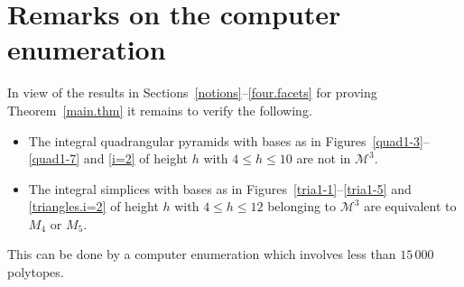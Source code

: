 \documentclass[a4paper]{article}
\theoremstyle{plain}
\begin{document}
\section{Remarks on the computer enumeration} \label{sect:computer-search}

In view of the results in
Sections~\ref{notions}--\ref{four.facets} for proving Theorem~\ref{main.thm} it remains to
verify the following.
\begin{itemize} 
  \item The integral quadrangular pyramids with bases as in
    Figures~\ref{quad1-3}--\ref{quad1-7} and \ref{i=2} of
    height $h$ with $4 \le h \le 10$ are not in ${\mathcal{M}^3}$. 
 \item The integral simplices with bases as in
   Figures~\ref{tria1-1}--\ref{tria1-5} and
   \ref{triangles.i=2} of height $h$ with $4 \le h \le 12$
   belonging to ${\mathcal{M}^3}$ are equivalent to $M_4$ or $M_5$.
\end{itemize}
This can be done by a computer enumeration which involves
less than $15\,000$ polytopes.

\small
\end{document}
